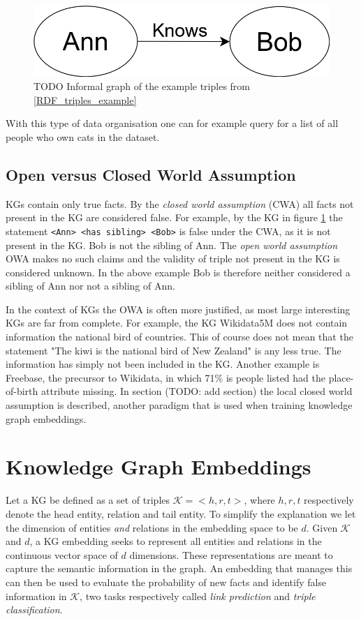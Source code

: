 \begin{figure}
\centering
    \includegraphics[scale=0.3]{figures/RDF_triple}
    \caption{TODO Informal graph of the example triples from \ref{RDF_triples_example}}
    
    \label{fig:KGexample}
\end{figure}

With this type of data organisation one can for example query for a list of all people who own cats in the dataset. 
\subsection{Open versus Closed World Assumption}
KGs contain only true facts. By the \textit{closed world assumption } (CWA) all facts not present in the KG are considered false. For example, by the KG in figure \ref{fig:KGexample} the statement \texttt{<Ann> <has sibling> <Bob>} is false under the CWA, as it is not present in the KG. Bob is not the sibling of Ann. The \textit{open world assumption} OWA makes no such claims and  the validity of triple not present in the KG is considered unknown. In the above example Bob is therefore neither considered a sibling of Ann nor not a sibling of Ann.

In the context of KGs the OWA is often more justified, as most large interesting KGs are far from complete. For example, the KG Wikidata5M does not contain information the national bird of countries. This of course does not mean that the statement "The kiwi is the national bird of New Zealand" is any less true. The information has simply not been included in the KG. Another example is Freebase, the precursor to Wikidata, in which 71\% is people listed had the place-of-birth attribute missing. In section (TODO: add section) the local closed world assumption is described, another paradigm that is used when training knowledge graph embeddings.


\section{Knowledge Graph Embeddings}
Let a KG be defined as a set of triples $\mathcal{K}={<h, r, t>}$, where $h, r, t$ respectively denote the head entity, relation and tail entity. To simplify the explanation we let the dimension of entities \emph{and} relations in the embedding space to be $d$.
Given $\mathcal{K}$ and $d$, a KG embedding seeks to represent all entities and relations in the continuous vector space of $d$ dimensions. These representations are meant to capture the semantic information in the graph. An embedding that manages this can then be used to evaluate the probability of new facts and identify false information in $\mathcal{K}$, two tasks respectively called \textit{link prediction} and \textit{triple classification}.




